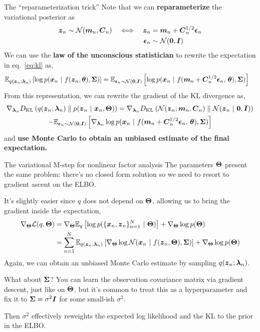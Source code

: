\documentclass[aspectratio=169]{beamer}
\begin{document}
\begin{frame}{The ``reparameterization trick''}
Note that we can \textbf{reparameterize} the variational posterior as 
\begin{align}
    \boldsymbol{z}_n &\sim \mathcal{N}(\boldsymbol{m}_n, \boldsymbol{C}_n) &\iff & &
    \boldsymbol{z}_n &= \boldsymbol{m}_n + \boldsymbol{C}_n^{1/2} \boldsymbol{\epsilon}_n \\
    & & & & \boldsymbol{\epsilon}_n &\sim \mathcal{N}(\boldsymbol{0}, \boldsymbol{I}) 
\end{align}
We can use the \textbf{law of the unconscious statistician} to rewrite the expectation in eq.~\ref{eq:kl} as,
\begin{align}
    \mathbb{E}_{q(\boldsymbol{z}_n; \boldsymbol{\lambda}_n)} \left[\log p(\boldsymbol{x}_n ~\vert~ f(\boldsymbol{z}_n, \boldsymbol{\theta}), \boldsymbol{\Sigma}) \right]
    &= \mathbb{E}_{\boldsymbol{\epsilon}_n \sim \mathcal{N}(\boldsymbol{0}, \boldsymbol{I})} \left[\log p(\boldsymbol{x}_n ~\vert~ f(\boldsymbol{m}_n + \boldsymbol{C}_n^{1/2} \boldsymbol{\epsilon}_n, \, \boldsymbol{\theta}), \boldsymbol{\Sigma}) \right]
\end{align}
From this representation, we can rewrite the gradient of the KL divergence as,
\begin{multline}
    \nabla_{\boldsymbol{\lambda}_n} D_{\textrm{KL}}\left(q(\boldsymbol{z}_n; \boldsymbol{\lambda}_n)\;\|\;p(\boldsymbol{z}_n ~\vert~ \boldsymbol{x}_n, \boldsymbol{\Theta})\right) 
    = 
    \nabla_{\boldsymbol{\lambda}_n} D_{\textrm{KL}}\left(\mathcal{N}(\boldsymbol{z}_n; \boldsymbol{m}_n, \boldsymbol{C}_n)\;\|\;\mathcal{N}(\boldsymbol{z}_n ~\vert~ \boldsymbol{0}, \boldsymbol{I})\right) \\
    - \mathbb{E}_{\boldsymbol{\epsilon}_n \sim \mathcal{N}(\boldsymbol{0}, \boldsymbol{I})} \left[\nabla_{\boldsymbol{\lambda}_n} \log p(\boldsymbol{x}_n ~\vert~ f(\boldsymbol{m}_n + \boldsymbol{C}_n^{1/2} \boldsymbol{\epsilon}_n, \, \boldsymbol{\theta}), \boldsymbol{\Sigma}) \right]
\end{multline}
and \textbf{use Monte Carlo to obtain an unbiased estimate of the final expectation.}
\end{frame}

\begin{frame}{The variational M-step for nonlinear factor analysis}
The parameters $\boldsymbol{\Theta}$ present the same problem: there's no closed form solution so we need to resort to gradient ascent on the ELBO. 

It's slightly easier since $q$ does not depend on $\boldsymbol{\Theta}$, allowing us to bring the gradient inside the expectation,
\begin{align}
    \nabla_{\boldsymbol{\Theta}} \mathcal{L}(q, \boldsymbol{\Theta}) &= 
    \nabla_{\boldsymbol{\Theta}} \mathbb{E}_q \left[ \log p(\{\boldsymbol{x}_n, \boldsymbol{z}_n\}_{n=1}^N ~\vert~ \boldsymbol{\Theta}) \right] + \nabla_{\boldsymbol{\Theta}} \log p(\boldsymbol{\Theta}) \\
    &=
    \label{eq:vem_mgrad}
    \sum_{n=1}^N \mathbb{E}_{q(\boldsymbol{z}_n; \boldsymbol{\lambda}_n)} \left[ \nabla_{\boldsymbol{\Theta}} \log \mathcal{N}(\boldsymbol{x}_n ~\vert~ f(\boldsymbol{z}_n, \boldsymbol{\Theta}), \boldsymbol{\Sigma}) \right] + \nabla_{\boldsymbol{\Theta}} \log p(\boldsymbol{\Theta})
\end{align}
Again, we can obtain an unbiased Monte Carlo estimate by sampling $q(\boldsymbol{z}_n; \boldsymbol{\lambda}_n)$.

What about $\boldsymbol{\Sigma}$? You can learn the observation covariance matrix via gradient descent, just like on $\boldsymbol{\Theta}$, but it's common to treat this as a hyperparameter and fix it to $\boldsymbol{\Sigma} = \sigma^2 \boldsymbol{I}$ for some small-ish $\sigma^2$. 

Then $\sigma^2$ effectively reweights the expected log likelihood and the KL to the prior in the ELBO.
\end{frame}
\end{document}
